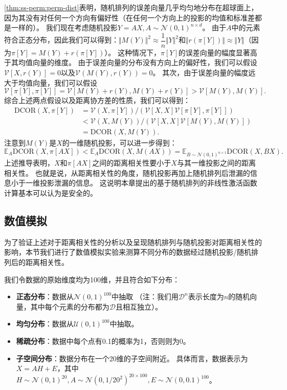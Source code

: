\autoref{thm:ss-perm:perm-dist}表明，随机排列的误差向量几乎均匀地分布在超球面上，因为其没有对任何一个方向有偏好性（在任何一个方向上的投影的均值和标准差都是一样的）。
%
我们现在考虑随机投影$Y = AX, A \sim \mathcal N(0, 1)^{n\times d}$。
由于$A$中的元素符合正态分布，因此我们可以得到：$\Vert M(Y) \Vert^2 \approx  \dfrac{1}{n} \Vert Y \Vert^2$和$\Vert r(\pi[Y]) \Vert \approx \Vert Y \Vert$（因为$\pi[Y] = M(Y) + r(\pi[Y])$）。
%
这种情况下，$\pi[Y]$的误差向量的幅度显著高于其均值向量的维度。
%
由于误差向量的分布没有方向上的偏好性，我们可以假设$\mathcal{V}[X, r(Y)] = 0$以及$\mathcal{V}(M(Y), r(Y)) = 0$。
%
其次，由于误差向量的幅度远大于均值向量，我们可以假设
\begin{equation}
\mathcal{V}[\pi[Y], \pi[Y]] = \mathcal{V}[M(Y) + r(Y), M(Y) + r(Y)] > \mathcal{V}[M(Y), M(Y)].
\end{equation}
%
综合上述两点假设以及距离协方差的性质，我们可以得到：
\begin{equation}
\begin{split}
    \text{DCOR}(X, \pi[Y]) &= \mathcal{V}(X, \pi[Y]) / (\mathcal{V}[X, X] \mathcal{V}[\pi[Y], \pi[Y]]) \\
    & < \mathcal{V}(X, M(Y)) / (\mathcal{V}[X, X] \mathcal{V}[M(Y), M(Y)]) \\
    & = \text{DCOR}(X, M(Y)).
\end{split}
\end{equation}
注意到$M(Y)$是$X$的一维随机投影，可以进一步得到：
\begin{equation}
    \mathbb E_A \text{DCOR}(X, \pi[AX]) < \mathbb E_A \text{DCOR}(X, M(AX)) = \mathbb E_{B \sim \mathcal N(0, 1)^{n\times 1}} \text{DCOR}(X, BX).
\end{equation}
%
上述推导表明，$X$和$\pi[AX]$之间的距离相关性要小于$X$与其一维投影之间的距离相关性。
也就是说，从距离相关性的角度，随机投影再加上随机排列后泄漏的信息小于一维投影泄漏的信息。
%
这说明本章提出的基于随机排列的非线性激活函数计算基本可以认为是安全的。


\subsection{数值模拟}
为了验证上述对于距离相关性的分析以及呈现随机排列与随机投影对距离相关性的影响，本节我们进行了数值模拟实验来测算不同分布的数据经过随机投影/随机排列后的距离相关性。
%

我们令数据的原始维度均为100维，并且符合如下分布：
\begin{itemize}
    \item \textbf{正态分布}：数据从$\mathcal N(0, 1)^{100}$中抽取
    （注：我们用$\mathcal D^{n}$表示长度为$n$的随机向量，其中每个元素的分布都为$\mathcal D$且相互独立）。
    \item \textbf{均匀分布}：数据从$\mathcal U(0, 1)^{100}$中抽取。
    \item \textbf{稀疏分布}：数据中每个点有0.1的概率为1，否则则为0。
    \item \textbf{子空间分布}：数据分布在一个20维的子空间附近。
    具体而言，数据表示为$X = AH + E$，其中$H \sim \mathcal N(0, 1)^{20}, A \sim \mathcal N(0, 1/{20^2})^{20\times 100}, E \sim \mathcal N(0, 0.1)^{100}$。
\end{itemize}


